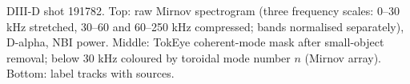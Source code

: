 \caption{DIII-D shot 191782. Top: raw Mirnov spectrogram (three frequency scales: 0--30 kHz stretched, 30--60 and 60--250 kHz compressed; bands normalised separately), D-alpha, NBI power. Middle: TokEye coherent-mode mask after small-object removal; below 30 kHz coloured by toroidal mode number $n$ (Mirnov array). Bottom: label tracks with sources.}
\label{fig:interpreter-191782}
